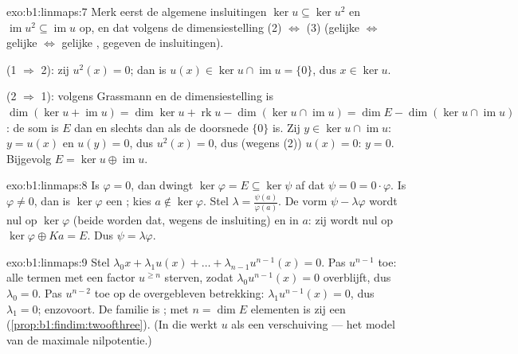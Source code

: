 \begin{solution}{exo:b1:linmaps:7}
Merk eerst de algemene insluitingen $\ker u \subseteq \ker u^2$ en
$\operatorname{im} u^2 \subseteq \operatorname{im} u$ op, en dat
volgens de dimensiestelling (2) $\iff$ (3) (gelijke  $\iff$
gelijke  $\iff$ gelijke , gegeven de insluitingen).

(1 $\Rightarrow$ 2): zij $u^2(x) = 0$; dan is $u(x) \in \ker u \cap
\operatorname{im} u = \{0\}$, dus $x \in \ker u$.

(2 $\Rightarrow$ 1): volgens Grassmann en de dimensiestelling is
$\dim(\ker u + \operatorname{im} u) = \dim\ker u + \operatorname{rk}
u - \dim(\ker u \cap \operatorname{im} u) = \dim E - \dim(\ker u
\cap \operatorname{im} u)$: de som is $E$ dan en slechts dan als de
doorsnede $\{0\}$ is. Zij $y \in \ker u \cap \operatorname{im} u$:
$y = u(x)$ en $u(y) = 0$, dus $u^2(x) = 0$, dus (wegens (2)) $u(x) =
0$: $y = 0$. Bijgevolg $E = \ker u \oplus \operatorname{im} u$.
\end{solution}

\begin{solution}{exo:b1:linmaps:8}
Is $\varphi = 0$, dan dwingt $\ker\varphi = E \subseteq \ker\psi$
af dat $\psi = 0 = 0\cdot\varphi$. Is $\varphi \neq 0$, dan is
$\ker\varphi$ een ; kies $a \notin \ker\varphi$. Stel
$\lambda = \frac{\psi(a)}{\varphi(a)}$. De vorm $\psi -
\lambda\varphi$ wordt nul op $\ker\varphi$ (beide worden dat, wegens
de insluiting) en in $a$: zij wordt nul op $\ker\varphi \oplus Ka =
E$. Dus $\psi = \lambda\varphi$.
\end{solution}

\begin{solution}{exo:b1:linmaps:9}
Stel $\lambda_0 x + \lambda_1 u(x) + \dots + \lambda_{n-1}
u^{n-1}(x) = 0$. Pas $u^{n-1}$ toe: alle termen met een factor
$u^{\geq n}$ sterven, zodat $\lambda_0 u^{n-1}(x) = 0$ overblijft,
dus $\lambda_0 = 0$. Pas $u^{n-2}$ toe op de overgebleven
betrekking: $\lambda_1 u^{n-1}(x) = 0$, dus $\lambda_1 = 0$;
enzovoort. De familie is ; met $n = \dim E$ elementen is zij een
 (\cref{prop:b1:findim:twoofthree}). (In die  werkt $u$
als een verschuiving --- het model van de maximale nilpotentie.)
\end{solution}

